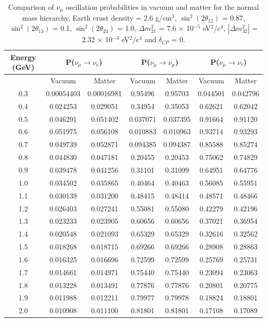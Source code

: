 \begin{table}
\centering
\begin{tabular}{| c | c | c | c | c | c | c |}
\hline
Energy (GeV) & \multicolumn{2}{|c|}{P($\nu_{\mu} \rightarrow \nu_{e}$)} & \multicolumn{2}{|c|}{P($\nu_{\mu} \rightarrow \nu_{\mu}$)} & \multicolumn{2}{|c|}{P($\nu_{\mu} \rightarrow \nu_{\tau}$)}\\
\hline
 & Vacuum & Matter & Vacuum & Matter & Vacuum & Matter \\
\hline
0.3 &  0.00054403 &  0.00016981 &  0.95496 &  0.95703 &  0.044501 &  0.042796\\
\hline
0.4 &  0.024253 &  0.029051 &  0.34954 &  0.35053 &  0.62621 &  0.62042\\
\hline
0.5 &  0.046291 &  0.051402 &  0.037071 &  0.037395 &  0.91664 &  0.91120\\
\hline
0.6 &  0.051975 &  0.056108 &  0.010883 &  0.010963 &  0.93714 &  0.93293\\
\hline
0.7 &  0.049739 &  0.052871 &  0.094385 &  0.094387 &  0.85588 &  0.85274\\
\hline
0.8 &  0.044830 &  0.047181 &  0.20455 &  0.20453 &  0.75062 &  0.74829\\
\hline
0.9 &  0.039478 &  0.041256 &  0.31101 &  0.31099 &  0.64951 &  0.64776\\
\hline
1.0 &  0.034502 &  0.035865 &  0.40464 &  0.40463 &  0.56085 &  0.55951\\
\hline
1.1 &  0.030139 &  0.031200 &  0.48415 &  0.48414 &  0.48571 &  0.48466\\
\hline
1.2 &  0.026403 &  0.027241 &  0.55081 &  0.55080 &  0.42279 &  0.42196\\
\hline
1.3 &  0.023233 &  0.023905 &  0.60656 &  0.60656 &  0.37021 &  0.36954\\
\hline
1.4 &  0.020548 &  0.021093 &  0.65329 &  0.65329 &  0.32616 &  0.32562\\
\hline
1.5 &  0.018268 &  0.018715 &  0.69266 &  0.69266 &  0.28908 &  0.28863\\
\hline
1.6 &  0.016325 &  0.016696 &  0.72599 &  0.72599 &  0.25769 &  0.25731\\
\hline
1.7 &  0.014661 &  0.014971 &  0.75440 &  0.75440 &  0.23094 &  0.23063\\
\hline
1.8 &  0.013228 &  0.013491 &  0.77876 &  0.77876 &  0.20801 &  0.20775\\
\hline
1.9 &  0.011988 &  0.012211 &  0.79977 &  0.79978 &  0.18824 &  0.18801\\
\hline
2.0 &  0.010908 &  0.011100 &  0.81801 &  0.81801 &  0.17108 &  0.17089\\
\hline
\end{tabular}
\caption{
 Comparison of $\nu_{\mu}$ oscillation probabilities in vacuum and matter for the normal mass hierarchy, Earth crust
 density = 2.6 g/cm$^{3}$, $ \sin^{2}(2 \theta_{12})$ = 0.87, $\sin^{2}(2 \theta_{13})$ = 0.1, $\sin^{2}(2 \theta_{23})$ = 1.0, 
 $\Delta m_{21}^{2}$ = 7.6 $\times$ 10$^{-5}$ eV$^{2}$/c$^{4}$, $|\Delta m_{32}^{2}|$ = 2.32 $\times$ 10$^{-3}$ eV$^{2}$/c$^{4}$ 
 and $\delta_{CP}$ = 0.
}
\label{numuOscMatterEffectsNH}
\end{table}

